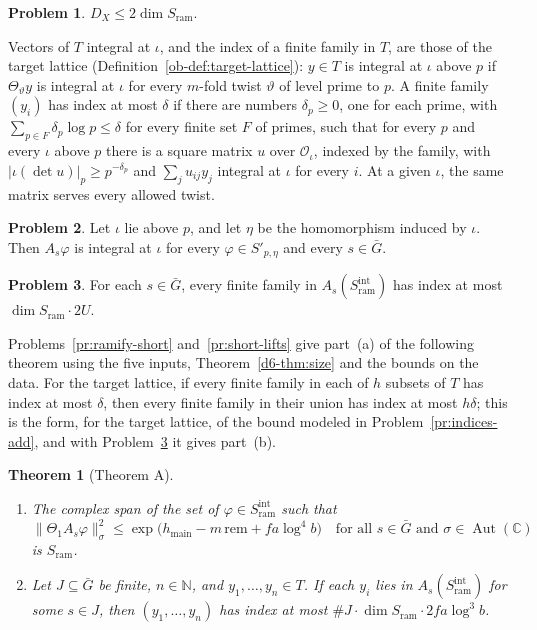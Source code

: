 \documentclass[reqno]{amsart}
\theoremstyle{definition}
\newtheorem{problem}{Problem}[section]
\theoremstyle{plain}
\newtheorem{theorem}{Theorem}[section]
\theoremstyle{definition}
\newcommand{\C}{\mathbb{C}}
\newcommand{\rem}{\mathrm{rem}}
\newcommand{\hm}{h_{\mathrm{main}}}
\newcommand{\Sram}{S_{\mathrm{ram}}}
\newcommand{\Oc}{\mathcal{O}}
\newcommand{\Gb}{\bar G}
\newcommand{\Aut}{\operatorname{Aut}}
\begin{document}
\begin{problem}\label{pr:dim-ramified}
\(D_X \le 2\dim \Sram\).
\end{problem}

Vectors of \(T\) integral at \(\iota\), and the index of a finite family in \(T\), are those of the target lattice (Definition~\ref{ob-def:target-lattice}): \(y \in T\) is integral at \(\iota\) above \(p\) if \(\Theta_\vartheta y\) is integral at \(\iota\) for every \(m\)-fold twist \(\vartheta\) of level prime to \(p\).  A finite family \((y_i)\) has index at most \(\delta\) if there are numbers \(\delta_p \ge 0\), one for each prime, with \(\sum_{p\in F}\delta_p\log p\le\delta\) for every finite set \(F\) of primes, such that for every \(p\) and every \(\iota\) above \(p\) there is a square matrix \(u\) over \(\Oc_\iota\), indexed by the family, with \(\lvert\iota(\det u)\rvert_p\ge p^{-\delta_p}\) and \(\sum_j u_{ij}y_j\) integral at \(\iota\) for every \(i\).  At a given \(\iota\), the same matrix serves every allowed twist.

\begin{problem}\label{pr:integral-image}
Let \(\iota\) lie above \(p\), and let \(\eta\) be the homomorphism induced by \(\iota\).  Then \(A_s\varphi\) is integral at \(\iota\) for every \(\varphi \in S'_{p,\eta}\) and every \(s \in \Gb\).
\end{problem}

\begin{problem}\label{pr:index-one-translate}
For each \(s \in \Gb\), every finite family in \(A_s(\Sram^{\mathrm{int}})\) has index at most \(\dim \Sram \cdot 2U\).
\end{problem}

Problems~\ref{pr:ramify-short} and~\ref{pr:short-lifts} give part~(a) of the following theorem using the five inputs, Theorem~\ref{d6-thm:size} and the bounds on the data.  For the target lattice, if every finite family in each of \(h\) subsets of \(T\) has index at most \(\delta\), then every finite family in their union has index at most \(h\delta\); this is the form, for the target lattice, of the bound modeled in Problem~\ref{pr:indices-add}, and with Problem~\ref{pr:index-one-translate} it gives part~(b).

\begin{theorem}[Theorem A]\label{thm:A}
\begin{enumerate}
\item[(a)] The complex span of the set of \(\varphi \in \Sram^{\mathrm{int}}\) such that
\[
  \lVert\Theta_1 A_s\varphi\rVert_\sigma^2 \le \exp\bigl(\hm - m\,\rem + fa\log^4 b\bigr) \quad\text{for all } s \in \Gb \text{ and } \sigma \in \Aut(\C)
\]
is \(\Sram\).
\item[(b)] Let \(J \subseteq \Gb\) be finite, \(n \in \mathbb{N}\), and \(y_1, \dots, y_n \in T\).  If each \(y_i\) lies in \(A_s(\Sram^{\mathrm{int}})\) for some \(s \in J\), then \((y_1, \dots, y_n)\) has index at most \(\#J\cdot\dim \Sram\cdot 2fa\log^3 b\).
\end{enumerate}
\end{theorem}
\end{document}
